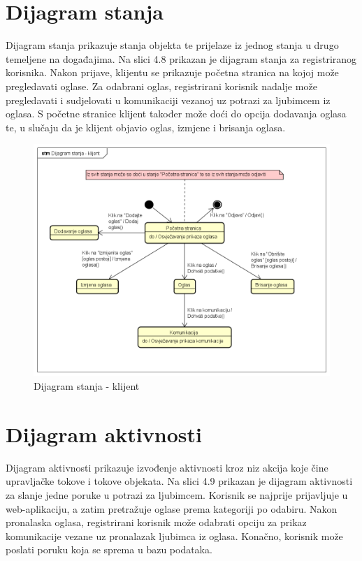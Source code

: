 \section{Dijagram stanja}


\noindent Dijagram stanja prikazuje stanja objekta te prijelaze iz jednog stanja u drugo temeljene na događajima. Na slici 4.8 prikazan je dijagram stanja za registriranog korisnika. Nakon prijave, klijentu se prikazuje početna stranica na kojoj može pregledavati oglase. Za odabrani oglas, registrirani korisnik nadalje može pregledavati i sudjelovati u komunikaciji vezanoj uz potrazi za ljubimcem iz oglasa. S početne stranice klijent također može doći do opcija dodavanja oglasa te, u slučaju da je klijent objavio oglas, izmjene i brisanja oglasa.

\begin{figure}[htb]
	\centering
	\includegraphics[width=\textwidth]{slike/Dijagram_stanja_-_klijent.png}
	\caption{Dijagram stanja - klijent}
\end{figure}

\eject

\section{Dijagram aktivnosti}

\noindent Dijagram aktivnosti prikazuje izvođenje aktivnosti kroz niz akcija koje čine upravljačke tokove i tokove objekata. Na slici 4.9 prikazan je dijagram aktivnosti za slanje jedne poruke u potrazi za ljubimcem. Korisnik se najprije prijavljuje u web-aplikaciju, a zatim pretražuje oglase prema kategoriji po odabiru. Nakon pronalaska oglasa, registrirani korisnik može odabrati opciju za prikaz komunikacije vezane uz pronalazak ljubimca iz oglasa. Konačno, korisnik može poslati poruku koja se sprema u bazu podataka.

